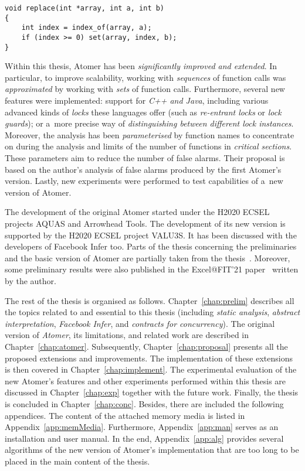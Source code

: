 \begin{lstlisting}[style=c, label={list:exampleViolation}, float=hbt, caption={An example of an \emph{atomicity violation}}]
void replace(int *array, int a, int b)
{
    int index = index_of(array, a);
    if (index >= 0) set(array, index, b);
}
\end{lstlisting}

Within this thesis, Atomer has been \emph{significantly improved and extended}. In particular, to improve scalability, working with \emph{sequences} of function calls was \emph{approximated} by working with \emph{sets} of function calls. Furthermore, several new features were implemented: support for \emph{C++ and Java}, including various advanced kinds of \emph{locks} these languages offer (such as \emph{re-entrant locks} or \emph{lock guards}); or a~more precise way of \emph{distinguishing between different lock instances}. Moreover, the analysis has been \emph{parameterised} by function names to concentrate on during the analysis and limits of the number of functions in \emph{critical sections}. These parameters aim to reduce the number of false alarms. Their proposal is based on the author's analysis of false alarms produced by the first Atomer's version. Lastly, new experiments were performed to test capabilities of a~new version of Atomer.

The development of the original Atomer started under the H2020 ECSEL projects AQUAS and Arrowhead Tools. The development of its new version is supported by the H2020 ECSEL project VALU3S. It has been discussed with the developers of Facebook Infer too. Parts of the thesis concerning the preliminaries and the basic version of Atomer are partially taken from the thesis~\cite{harmimBP}. Moreover, some preliminary results were also published in the Excel@FIT'21 paper~\cite{excel2021Harmim} written by the author.

The rest of the thesis is organised as follows. Chapter~\ref{chap:prelim} describes all the topics related to and essential to this thesis (including \emph{static analysis}, \emph{abstract interpretation}, \emph{Facebook Infer}, and \emph{contracts for concurrency}). The original version of \emph{Atomer}, its limitations, and related work are described in Chapter~\ref{chap:atomer}. Subsequently, Chapter~\ref{chap:proposal} presents all the proposed extensions and improvements. The implementation of these extensions is then covered in Chapter~\ref{chap:implement}. The experimental evaluation of the new Atomer's features and other experiments performed within this thesis are discussed in Chapter~\ref{chap:exp} together with the future work. Finally, the thesis is concluded in Chapter~\ref{chap:conc}. Besides, there are included the following appendices. The content of the attached memory media is listed in Appendix~\ref{app:memMedia}. Furthermore, Appendix~\ref{app:man} serves as an installation and user manual. In the end, Appendix~\ref{app:alg} provides several algorithms of the new version of Atomer's implementation that are too long to be placed in the main content of the thesis.



